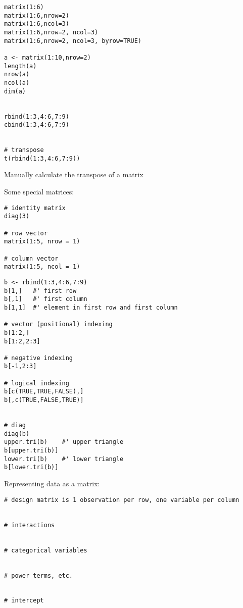 \documentclass[a4paper,12pt]{article}
\begin{document}
\begin{lstlisting}
matrix(1:6)
matrix(1:6,nrow=2)
matrix(1:6,ncol=3)
matrix(1:6,nrow=2, ncol=3)
matrix(1:6,nrow=2, ncol=3, byrow=TRUE)

a <- matrix(1:10,nrow=2)
length(a)
nrow(a)
ncol(a)
dim(a)


rbind(1:3,4:6,7:9)
cbind(1:3,4:6,7:9)


# transpose
t(rbind(1:3,4:6,7:9))

\end{lstlisting}


Manually calculate the transpose of a matrix


Some special matrices:

\begin{lstlisting}
# identity matrix
diag(3)

# row vector
matrix(1:5, nrow = 1)

# column vector
matrix(1:5, ncol = 1)
\end{lstlisting}





\begin{lstlisting}
b <- rbind(1:3,4:6,7:9)
b[1,]	#' first row
b[,1]	#' first column
b[1,1]	#' element in first row and first column

# vector (positional) indexing
b[1:2,]
b[1:2,2:3]

# negative indexing
b[-1,2:3]

# logical indexing
b[c(TRUE,TRUE,FALSE),]
b[,c(TRUE,FALSE,TRUE)]


# diag
diag(b)
upper.tri(b)	#' upper triangle
b[upper.tri(b)]
lower.tri(b)	#' lower triangle
b[lower.tri(b)]
\end{lstlisting}




Representing data as a matrix:

\begin{lstlisting}
# design matrix is 1 observation per row, one variable per column


# interactions


# categorical variables


# power terms, etc.


# intercept


\end{lstlisting}





\end{document}
